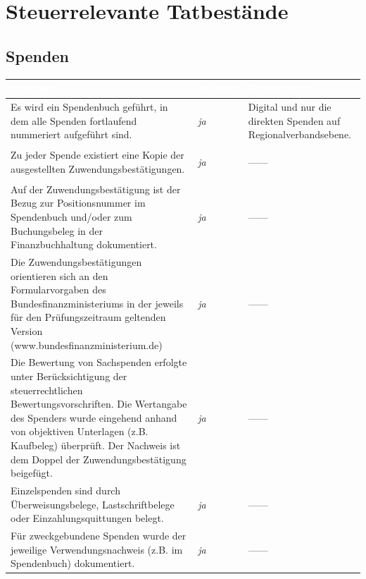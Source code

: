 \documentclass[%
	titlepage,oneside,12pt,headlines=1.5,numbers=noenddot, chapterprefix=false,parskip=full-,DIV=14,pagesize]{scrreprt}
\newcommand*{\ditto}{\begin{center}\vspace{-0.40in}---\quad \textquotedbl\quad ---\vspace{-0.24in}\end{center}}
\begin{document}
\chapter{Steuerrelevante Tatbestände}
\section{Spenden}
\begin{longtable}[ht]{|p{} p{} p{}|}
\hline\rowcolor{pirateorange} 
	\footnotesize\textcolor{white}{\textbf{Prüfung}} & \footnotesize\textcolor{white}{\textbf{Ja/Nein}} & \footnotesize\textcolor{white}{\textbf{Kommentar}}\\\endhead
        \scriptsize Es wird ein Spendenbuch  geführt, in dem alle Spenden fortlaufend nummeriert aufgeführt sind. & \scriptsize \textit{ja}  & \scriptsize Digital und nur die direkten Spenden auf Regionalverbandsebene.\\ 
        \scriptsize Zu jeder Spende existiert eine Kopie der ausgestellten  Zuwendungsbestätigungen. & \scriptsize \textit{ja}	& \scriptsize \ditto  \\
        \scriptsize Auf der Zuwendungsbestätigung ist der Bezug zur Positionsnummer im Spendenbuch und/oder zum Buchungsbeleg in der Finanzbuchhaltung dokumentiert. & \scriptsize \textit{ja} & \scriptsize \ditto  \\
       	\scriptsize Die Zuwendungsbestätigungen orientieren sich an den Formularvorgaben des Bundesfinanzministeriums in der jeweils für den Prüfungszeitraum geltenden Version (www.bundesfinanzministerium.de) & \scriptsize \textit{ja} & \scriptsize \ditto  \\
       	\scriptsize Die Bewertung von Sachspenden  erfolgte unter Berücksichtigung der steuerrechtlichen Bewertungsvorschriften. Die Wertangabe des Spenders wurde eingehend  anhand von objektiven Unterlagen (z.B. Kaufbeleg) überprüft. Der Nachweis ist dem Doppel der Zuwendungsbestätigung beigefügt. & \scriptsize \textit{ja} & \scriptsize \ditto \\
       	\scriptsize Einzelspenden  sind durch Überweisungsbelege, Lastschriftbelege oder Einzahlungsquittungen belegt. & \scriptsize \textit{ja} & \scriptsize \ditto \\
        \scriptsize Für zweckgebundene Spenden wurde der jeweilige Verwendungsnachweis (z.B. im Spendenbuch) dokumentiert. & \scriptsize \textit{ja}  	& \scriptsize \ditto \\
\hline
\end{longtable}
\end{document}
